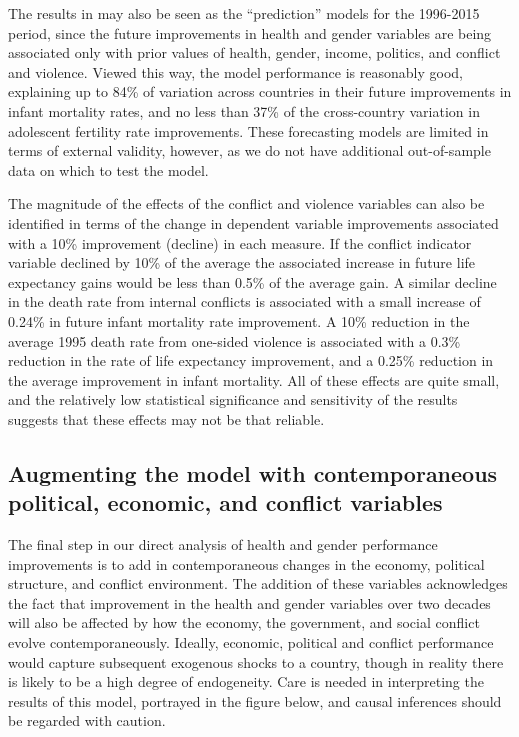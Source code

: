 \documentclass[12pt]{article}
\begin{document}
The results in  may also be seen as the \enquote{prediction} models for the 1996-2015 period, since the future improvements in health and gender variables are being associated only with prior values of health, gender, income, politics, and conflict and violence. Viewed this way, the model performance is reasonably good, explaining up to 84\% of variation across countries in their future improvements in infant mortality rates, and no less than 37\% of the cross-country variation in adolescent fertility rate improvements. These forecasting models are limited in terms of external validity, however, as we do not have additional out-of-sample data on which to test the model.

The magnitude of the effects of the conflict and violence variables can also be identified in terms of the change in dependent variable improvements associated with a 10\% improvement (decline) in each measure. If the conflict indicator variable declined by 10\% of the average the associated increase in future life expectancy gains would be less than 0.5\% of the average gain. A similar decline in the death rate from internal conflicts is associated with a small increase of 0.24\% in future infant mortality rate improvement. A 10\% reduction in the average 1995 death rate from one-sided violence is associated with a 0.3\% reduction in the rate of life expectancy improvement, and a 0.25\% reduction in the average improvement in infant mortality. All of these effects are quite small, and the relatively low statistical significance and sensitivity of the results suggests that these effects may not be that reliable.

\subsection{Augmenting the model with contemporaneous political, economic, and conflict variables}

The final step in our direct analysis of health and gender performance improvements is to add in contemporaneous changes in the economy, political structure, and conflict environment. The addition of these variables acknowledges the fact that improvement in the health and gender variables over two decades will also be affected by how the economy, the government, and social conflict evolve contemporaneously. Ideally, economic, political and conflict performance would capture subsequent exogenous shocks to a country, though in reality there is likely to be a high degree of endogeneity. Care is needed in interpreting the results of this model, portrayed in the figure below, and causal inferences should be regarded with caution.
\end{document}
